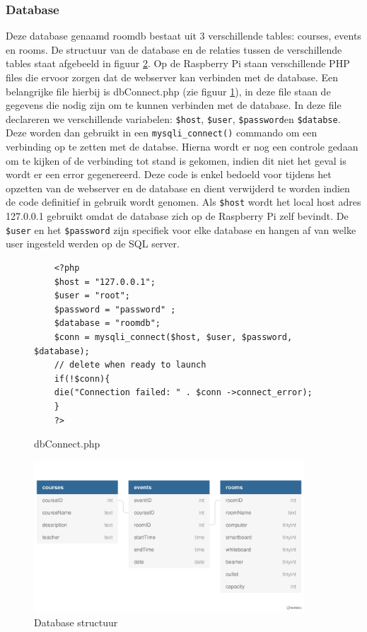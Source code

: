 \documentclass[a4paper,kul]{kulakarticle} %
\begin{document}
\subsubsection{Database}
Deze database genaamd roomdb bestaat uit 3 verschillende tables: courses, events en rooms. De structuur van de database en de relaties tussen de verschillende tables staat afgebeeld in figuur \ref{fig:dbstruct}. Op de Raspberry Pi staan verschillende PHP files die ervoor zorgen dat de webserver kan verbinden met de database. Een belangrijke file hierbij is dbConnect.php (zie figuur \ref{fig:dbconnect}), in deze file staan de gegevens die nodig zijn om te kunnen verbinden met de database. In deze  file declareren we verschillende variabelen: \verb|$host|, \verb|$user|, \verb|$password|en \verb|$databse|. Deze worden dan gebruikt in een \verb|mysqli_connect()| commando om een verbinding op te zetten met de databse. Hierna wordt er nog een controle gedaan om te kijken of de verbinding tot stand is gekomen, indien dit niet het geval is wordt er een error gegenereerd. Deze code is enkel bedoeld voor tijdens het opzetten van de webserver en de database en dient verwijderd te worden indien de code definitief in gebruik wordt genomen. Als \verb|$host| wordt het local host adres 127.0.0.1 gebruikt omdat de database zich op de Raspberry Pi zelf bevindt. De \verb|$user| en het \verb|$password| zijn specifiek voor elke database en hangen af van welke user ingesteld werden op de SQL server. 
\begin{figure}[h]
	\begin{verbatim}
	<?php
	$host = "127.0.0.1";
	$user = "root";
	$password = "password" ;
	$database = "roomdb";
	$conn = mysqli_connect($host, $user, $password, $database);
	// delete when ready to launch
	if(!$conn){
	die("Connection failed: " . $conn ->connect_error);
	}
	?>
	\end{verbatim}
	\caption{dbConnect.php}
	\label{fig:dbconnect}
\end{figure}
\begin{figure}[h]
	\includegraphics[width=0.9\textwidth]{dbstruct}
	\caption{Database structuur}
	\label{fig:dbstruct}
\end{figure}
\end{document}
